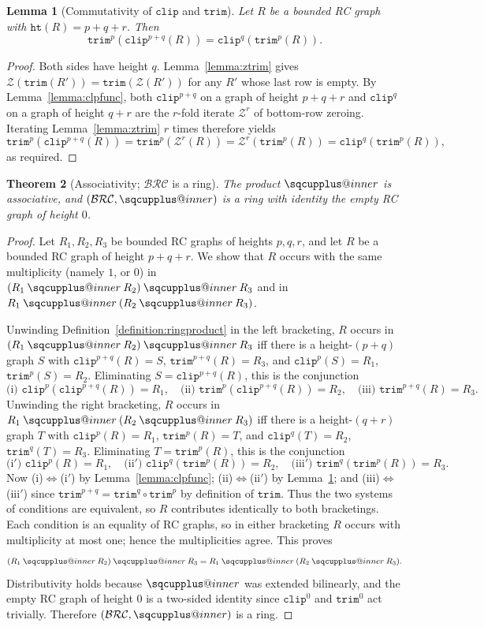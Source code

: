 \documentclass{amsart}
\makeatletter
\newtheorem{theorem}{Theorem}[section]
\newtheorem{lemma}[theorem]{Lemma}
\theoremstyle{definition}
\theoremstyle{remark}
\newcommand{\BRC}{\mathcal{BRC}}
\newcommand{\hr}{\mathtt{ht}}
\newcommand{\trm}{\mathtt{trim}}
\newcommand{\clp}{\mathtt{clip}}
\newcommand{\zeromap}{\mathcal{Z}}
\newcommand{\sqcupplus@inner}[2]{%
  \vcenter{\hbox{\ooalign{%
    \hfil$\m@th#1\sqcup$\hfil\cr
    \hfil\raisebox{0.15ex}{$\m@th#1\scriptscriptstyle+$}\hfil\cr
  }}}%
}
\newcommand{\sqcupplus}{\mathbin{\mathpalette\sqcupplus@inner\relax}}
\makeatother
\begin{document}
\begin{lemma}[Commutativity of $\clp$ and $\trm$]\label{lemma:clptrm}
Let $R$ be a bounded RC graph with $\hr(R)=p+q+r$. Then
\[
\trm^p(\clp^{p+q}(R))=\clp^q(\trm^p(R)).
\]
\end{lemma}
\begin{proof}
Both sides have height $q$. Lemma~\ref{lemma:ztrim} gives $\zeromap(\trm(R'))=\trm(\zeromap(R'))$ for any $R'$ whose last row is empty. By Lemma~\ref{lemma:clpfunc}, both $\clp^{p+q}$ on a graph of height $p+q+r$ and $\clp^q$ on a graph of height $q+r$ are the $r$-fold iterate $\zeromap^r$ of bottom-row zeroing. Iterating Lemma~\ref{lemma:ztrim} $r$ times therefore yields
\[
\trm^p(\clp^{p+q}(R))=\trm^p(\zeromap^r(R))=\zeromap^r(\trm^p(R))=\clp^q(\trm^p(R)),
\]
as required.
\end{proof}

\begin{theorem}[Associativity; $\BRC$ is a ring]\label{theorem:ring_associative}
The product $\sqcupplus$ is associative, and $(\BRC,\sqcupplus)$ is a ring with identity the empty RC graph of height $0$.
\end{theorem}
\begin{proof}
Let $R_1,R_2,R_3$ be bounded RC graphs of heights $p,q,r$, and let $R$ be a bounded RC graph of height $p+q+r$. We show that $R$ occurs with the same multiplicity (namely $1$, or $0$) in $(R_1\sqcupplus R_2)\sqcupplus R_3$ and in $R_1\sqcupplus(R_2\sqcupplus R_3)$.

Unwinding Definition~\ref{definition:ringproduct} in the left bracketing, $R$ occurs in $(R_1\sqcupplus R_2)\sqcupplus R_3$ iff there is a height-$(p+q)$ graph $S$ with $\clp^{p+q}(R)=S$, $\trm^{p+q}(R)=R_3$, and $\clp^p(S)=R_1$, $\trm^p(S)=R_2$. Eliminating $S=\clp^{p+q}(R)$, this is the conjunction
\[
\text{(i) } \clp^p(\clp^{p+q}(R))=R_1,\quad
\text{(ii) } \trm^p(\clp^{p+q}(R))=R_2,\quad
\text{(iii) } \trm^{p+q}(R)=R_3.
\]
Unwinding the right bracketing, $R$ occurs in $R_1\sqcupplus(R_2\sqcupplus R_3)$ iff there is a height-$(q+r)$ graph $T$ with $\clp^p(R)=R_1$, $\trm^p(R)=T$, and $\clp^q(T)=R_2$, $\trm^q(T)=R_3$. Eliminating $T=\trm^p(R)$, this is the conjunction
\[
\text{(i$'$) } \clp^p(R)=R_1,\quad
\text{(ii$'$) } \clp^q(\trm^p(R))=R_2,\quad
\text{(iii$'$) } \trm^q(\trm^p(R))=R_3.
\]
Now (i)$\Leftrightarrow$(i$'$) by Lemma~\ref{lemma:clpfunc}; (ii)$\Leftrightarrow$(ii$'$) by Lemma~\ref{lemma:clptrm}; and (iii)$\Leftrightarrow$(iii$'$) since $\trm^{p+q}=\trm^q\circ\trm^p$ by definition of $\trm$. Thus the two systems of conditions are equivalent, so $R$ contributes identically to both bracketings. Each condition is an equality of RC graphs, so in either bracketing $R$ occurs with multiplicity at most one; hence the multiplicities agree. This proves
\[
(R_1\sqcupplus R_2)\sqcupplus R_3 = R_1\sqcupplus(R_2\sqcupplus R_3).
\]
Distributivity holds because $\sqcupplus$ was extended bilinearly, and the empty RC graph of height $0$ is a two-sided identity since $\clp^0$ and $\trm^0$ act trivially. Therefore $(\BRC,\sqcupplus)$ is a ring.
\end{proof}
\end{document}
